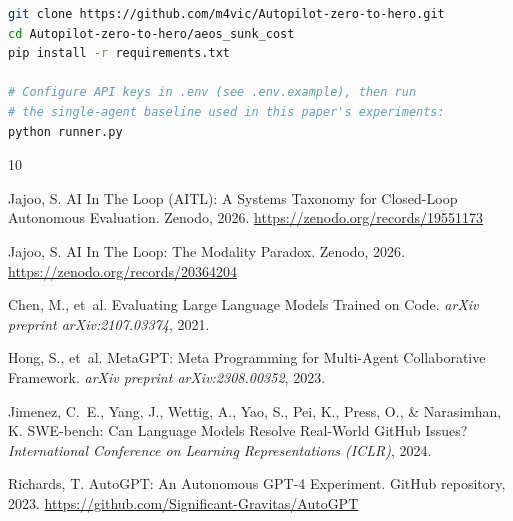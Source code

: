 \documentclass[11pt]{article}
\begin{document}
\begin{lstlisting}[language=bash]
git clone https://github.com/m4vic/Autopilot-zero-to-hero.git
cd Autopilot-zero-to-hero/aeos_sunk_cost
pip install -r requirements.txt

# Configure API keys in .env (see .env.example), then run
# the single-agent baseline used in this paper's experiments:
python runner.py
\end{lstlisting}


\begin{thebibliography}{10}

Jajoo, S.
\newblock AI In The Loop (AITL): A Systems Taxonomy for Closed-Loop Autonomous Evaluation.
\newblock Zenodo, 2026.
\newblock \url{https://zenodo.org/records/19551173}

Jajoo, S.
\newblock AI In The Loop: The Modality Paradox.
\newblock Zenodo, 2026.
\newblock \url{https://zenodo.org/records/20364204}

Chen, M., et~al.
\newblock Evaluating Large Language Models Trained on Code.
\newblock \emph{arXiv preprint arXiv:2107.03374}, 2021.

Hong, S., et~al.
\newblock MetaGPT: Meta Programming for Multi-Agent Collaborative Framework.
\newblock \emph{arXiv preprint arXiv:2308.00352}, 2023.

Jimenez, C.~E., Yang, J., Wettig, A., Yao, S., Pei, K., Press, O., \& Narasimhan, K.
\newblock SWE-bench: Can Language Models Resolve Real-World GitHub Issues?
\newblock \emph{International Conference on Learning Representations (ICLR)}, 2024.

Richards, T.
\newblock AutoGPT: An Autonomous GPT-4 Experiment.
\newblock GitHub repository, 2023.
\newblock \url{https://github.com/Significant-Gravitas/AutoGPT}

\end{thebibliography}
\end{document}
